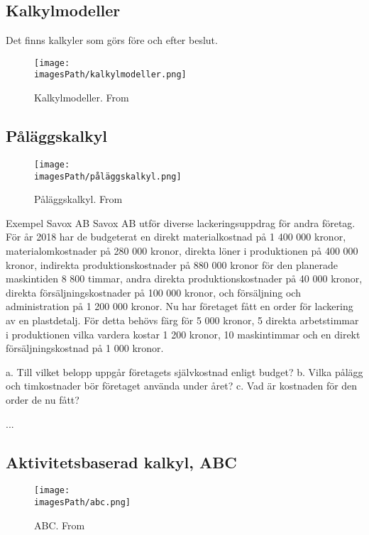 \subsection{Kalkylmodeller}
Det finns kalkyler som görs före och efter beslut.
\begin{figure}[H]
    \centering
    \texttt{[image: \\imagesPath/kalkylmodeller.png]}
    \caption{Kalkylmodeller. From \cite{im}}
\end{figure}


\newpage
\subsection{Påläggskalkyl}
\begin{figure}[H]
    \centering
    \texttt{[image: \\imagesPath/påläggskalkyl.png]}
    \caption{Påläggskalkyl. From \cite{im}}
\end{figure}

\begin{exampleblock}{Exempel Savox AB}
   Savox AB utför diverse lackeringsuppdrag för andra företag. För år 2018 har de 
   budgeterat en direkt materialkostnad på 1 400 000 kronor, materialomkostnader på 
   280 000 kronor, direkta löner i produktionen på 400 000 kronor, indirekta produktionskostnader 
   på 880 000 kronor för den planerade maskintiden 8 800 timmar, andra direkta 
   produktionskostnader på 40 000 kronor, direkta försäljningskostnader på 100 000 kronor, 
   och försäljning och administration på 1 200 000 kronor. Nu har företaget fått en order för 
   lackering av en plastdetalj. För detta behövs färg för 5 000 kronor, 5 direkta 
   arbetstimmar i produktionen vilka vardera kostar 1 200 kronor, 10 maskintimmar och en 
   direkt försäljningskostnad på 1 000 kronor. 

   a. Till vilket belopp uppgår företagets självkostnad enligt budget?
   b. Vilka pålägg och timkostnader bör företaget använda under året? 
   c. Vad är kostnaden för den order de nu fått? 

   ... %
\end{exampleblock}

%
%
%

\newpage
\subsection{Aktivitetsbaserad kalkyl, ABC}
\begin{figure}[H]
    \centering
    \texttt{[image: \\imagesPath/abc.png]}
    \caption{ABC. From \cite{im}}
\end{figure}

